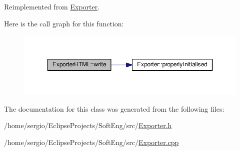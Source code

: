 Reimplemented from \hyperlink{class_exporter_ac095b6486da16ffc76539f8c6c67be70}{Exporter}.

Here is the call graph for this function\+:
\nopagebreak
\begin{figure}[H]
\begin{center}
\leavevmode
\includegraphics[width=350pt]{class_exporter_h_t_m_l_aa5b12621501f09a9a082e9337fbf943c_cgraph}
\end{center}
\end{figure}


The documentation for this class was generated from the following files\+:\begin{DoxyCompactItemize}
\item 
/home/sergio/\+Eclipse\+Projects/\+Soft\+Eng/src/\hyperlink{_exporter_8h}{Exporter.\+h}\item 
/home/sergio/\+Eclipse\+Projects/\+Soft\+Eng/src/\hyperlink{_exporter_8cpp}{Exporter.\+cpp}\end{DoxyCompactItemize}
